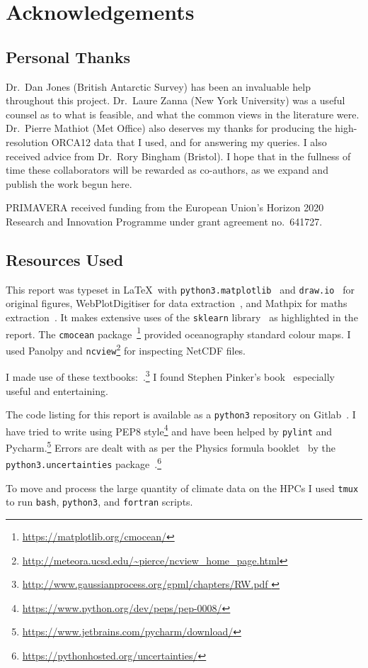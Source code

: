 \section{Acknowledgements}
\subsection{Personal Thanks}
Dr.\ Dan Jones (British Antarctic Survey) has been an invaluable help throughout this project.
Dr.\ Laure Zanna (New York University) was a useful counsel as to what is feasible,
 and what the common views in the literature were.
Dr.\ Pierre Mathiot (Met Office) also deserves my thanks for
producing the high-resolution ORCA12 data that I used, and
for answering my queries.
I also received advice from Dr.\ Rory Bingham (Bristol).
I hope that in the fullness of time these collaborators will be rewarded
as co-authors, as we expand and publish the
work begun here.

PRIMAVERA received funding from the European Union's Horizon 2020
Research and Innovation Programme under grant agreement no.~641727.


\subsection{Resources Used}

This report was typeset in \LaTeX\
with \texttt{python3.matplotlib}~\cite{Hunter:2007} and \texttt{draw.io}~\cite{DrawIO}
for original figures, WebPlotDigitiser for data extraction~\cite{WebPlotDigitiser},
and Mathpix for maths extraction~\cite{mathpix}.
It makes extensive uses of the \texttt{sklearn} library~\cite{scikit-learn} as highlighted in the report.
The \texttt{cmocean} package~\cite{thyng2016true}\footnote{\url{https://matplotlib.org/cmocean/}}
provided oceanography standard colour maps.
I used Panolpy and \texttt{ncview}\footnote{\url{http://meteora.ucsd.edu/~pierce/ncview_home_page.html}}
for inspecting NetCDF files.

I made use of these textbooks:~\cite{roisin2010GFD,williams2011ocean,ITILA,
sivia2006data,williams2006gaussian,
}.\footnote{\url{http://www.gaussianprocess.org/gpml/chapters/RW.pdf
}}
I found Stephen Pinker's book~\cite{pinker2015sense} especially useful and entertaining.

The code listing for this report is available as a \texttt{python3} repository on Gitlab~\cite{gitlab, skextremes}.
 I have tried to write using PEP8 style\footnote{\url{https://www.python.org/dev/peps/pep-0008/}}
 and have been helped by \texttt{pylint} and Pycharm.\footnote{\url{https://www.jetbrains.com/pycharm/download/}}
 Errors are dealt with as per the Physics formula booklet~\cite{MathsFormulaBooklet}
 by the \texttt{python3.uncertainties}
 package~\cite{lebigot2010uncertainties}.\footnote{\url{https://pythonhosted.org/uncertainties/}}

 To move and process the large quantity of climate data on the HPCs I used \texttt{tmux}
 to run \texttt{bash}, \texttt{python3}, and \texttt{fortran} scripts.
